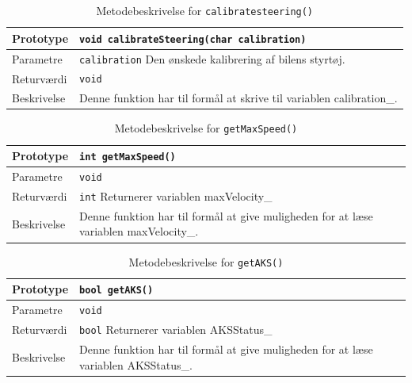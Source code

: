 \begin{table}[h]
\begin{tabularx}{\textwidth}{| L{2.5 cm} | Z |} \hline
Prototype 	& \texttt{void calibrateSteering(char calibration)} \\\hline
Parametre 	& \texttt{calibration}		\newline Den ønskede kalibrering af bilens styrtøj.\\\hline
Returværdi	& \texttt{void} 			\newline \\\hline
Beskrivelse	& Denne funktion har til formål at skrive til variablen calibration\_.\newline \\\hline
\end{tabularx}
\caption{Metodebeskrivelse for \texttt{calibratesteering()}}
\label{table:met_calibratesteering}
\end{table}

\begin{table}[h]
\begin{tabularx}{\textwidth}{| L{2.5 cm} | Z |} \hline
Prototype 	& \texttt{int getMaxSpeed()} \\\hline
Parametre 	& \texttt{void}			\newline \\\hline
Returværdi	& \texttt{int} 			\newline Returnerer variablen maxVelocity\_\\\hline
Beskrivelse	& Denne funktion har til formål at give muligheden for at læse variablen maxVelocity\_.\newline \\\hline
\end{tabularx}
\caption{Metodebeskrivelse for \texttt{getMaxSpeed()}}
\label{table:met_getmaxspeed}
\end{table}

\clearpage

\begin{table}[h]
\begin{tabularx}{\textwidth}{| L{2.5 cm} | Z |} \hline
Prototype 	& \texttt{bool getAKS()} \\\hline
Parametre 	& \texttt{void}			\newline \\\hline
Returværdi	& \texttt{bool}			\newline Returnerer variablen AKSStatus\_\\\hline
Beskrivelse	& Denne funktion har til formål at give muligheden for at læse variablen AKSStatus\_.\newline \\\hline
\end{tabularx}
\caption{Metodebeskrivelse for \texttt{getAKS()}}
\label{table:met_getaks}
\end{table}

